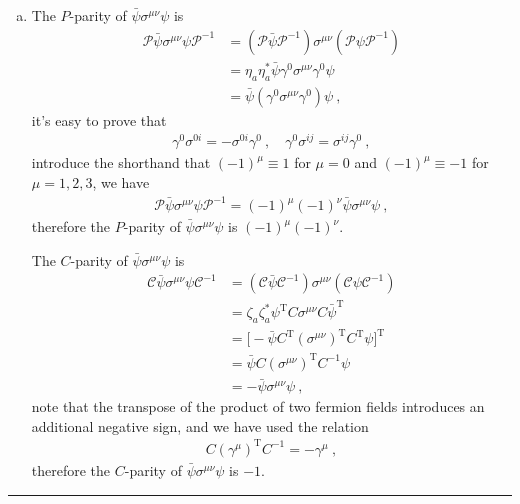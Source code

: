 \documentclass[12pt]{report}
\numberwithin{problemname}{chapter}
\newenvironment{solution}{\vspace{1em}\par\noindent{\large\textbf{\textsc{Solution}}}\par}{\vspace{1em}\hrule}
\begin{document}
\begin{solution}
\begin{enumerate}[(a)]
    \item The $P$-parity of $\bar{\psi}\sigma^{\mu\nu}\psi$ is
    \begin{align}
        \mathcal{P}\bar{\psi}\sigma^{\mu\nu}\psi\mathcal{P}^{-1}&=(\mathcal{P}\bar{\psi}\mathcal{P}^{-1})\sigma^{\mu\nu}(\mathcal{P}\psi\mathcal{P}^{-1}) \nonumber \\
        &=\eta_a\eta^*_a\bar{\psi}\gamma^0\sigma^{\mu\nu}\gamma^0\psi \nonumber \\
        &=\bar{\psi}(\gamma^0\sigma^{\mu\nu}\gamma^0)\psi\ ,
    \end{align}
    it's easy to prove that
    \begin{align}
        \gamma^0\sigma^{0i}=-\sigma^{0i}\gamma^0\ ,\quad \gamma^0\sigma^{ij}=\sigma^{ij}\gamma^0\ ,
    \end{align}
    introduce the shorthand that $(-1)^{\mu}\equiv 1$ for $\mu=0$ and $(-1)^{\mu}\equiv -1$ for $\mu=1,2,3$, we have
    \begin{align}
        \mathcal{P}\bar{\psi}\sigma^{\mu\nu}\psi\mathcal{P}^{-1}=(-1)^{\mu}(-1)^{\nu}\bar{\psi}\sigma^{\mu\nu}\psi\ ,
    \end{align}
    therefore the $P$-parity of $\bar{\psi}\sigma^{\mu\nu}\psi$ is $(-1)^{\mu}(-1)^{\nu}$. \par
    The $C$-parity of $\bar{\psi}\sigma^{\mu\nu}\psi$ is
    \begin{align}
        \mathcal{C}\bar{\psi}\sigma^{\mu\nu}\psi\mathcal{C}^{-1}&=(\mathcal{C}\bar{\psi}\mathcal{C}^{-1})\sigma^{\mu\nu}(\mathcal{C}\psi\mathcal{C}^{-1}) \nonumber \\
        &=\zeta_a\zeta_a^*\psi^{\text{T}}C\sigma^{\mu\nu}C\bar{\psi}^{\text{T}} \nonumber \\
        &=\bigg[-\bar{\psi}C^{\text{T}}(\sigma^{\mu\nu})^{\text{T}}C^{\text{T}}\psi\bigg]^{\text{T}} \nonumber \\
        &=\bar{\psi}C(\sigma^{\mu\nu})^{\text{T}}C^{-1}\psi \nonumber \\
        &=-\bar{\psi}\sigma^{\mu\nu}\psi \ ,
    \end{align}
    note that the transpose of the product of two fermion fields introduces an additional negative sign, and we have used the relation
    \begin{align}
        C(\gamma^{\mu})^{\text{T}}C^{-1}=-\gamma^{\mu}\ ,
    \end{align}
    therefore the $C$-parity of $\bar{\psi}\sigma^{\mu\nu}\psi$ is $-1$. \par

\end{enumerate}
\end{solution}
\end{document}
